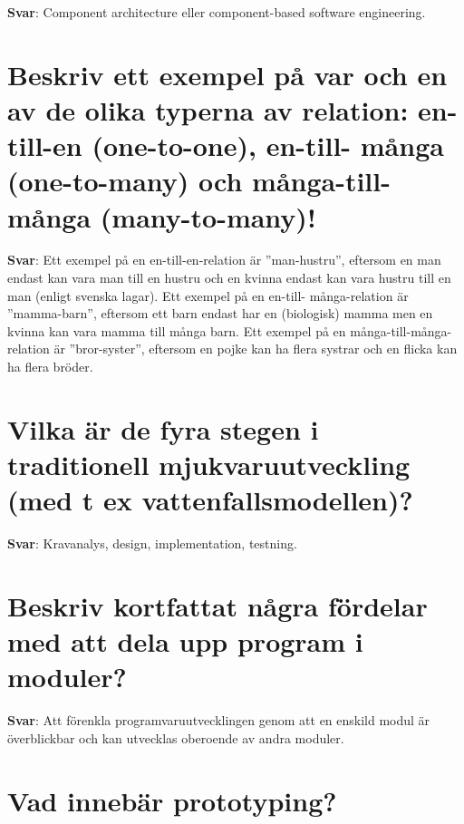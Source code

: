 \documentclass[a4paper,11pt,oneside]{book}
\begin{document}
\begin{sloppypar}
\textbf{Svar}: Component architecture eller component-based software engineering.



\section{Beskriv ett exempel p\r{a} var och en av de olika typerna av relation: en-till-en (one-to-one), en-till- m\r{a}nga (one-to-many) och m\r{a}nga-till-m\r{a}nga (many-to-many)!}

\label{q:232:sa:sv:True}

\textbf{Svar}: Ett exempel p\r{a} en en-till-en-relation \"ar {\textquotedblright}man-hustru{\textquotedblright}, eftersom en man endast kan vara man till en hustru och en kvinna endast kan vara hustru till en man (enligt svenska lagar). Ett exempel p\r{a} en en-till- m\r{a}nga-relation \"ar {\textquotedblright}mamma-barn{\textquotedblright}, eftersom ett barn endast har en (biologisk) mamma men en kvinna kan vara mamma till m\r{a}nga barn. Ett exempel p\r{a} en m\r{a}nga-till-m\r{a}nga-relation \"ar {\textquotedblright}bror-syster{\textquotedblright}, eftersom en pojke kan ha flera systrar och en flicka kan ha flera br\"oder.



\section{Vilka \"ar de fyra stegen i traditionell mjukvaruutveckling (med t ex vattenfallsmodellen)?}

\label{q:233:sa:sv:True}

\textbf{Svar}: Kravanalys, design, implementation, testning.



\section{Beskriv kortfattat n\r{a}gra f\"ordelar med att dela upp program i moduler?}

\label{q:234:sa:sv:True}

\textbf{Svar}: Att f\"orenkla programvaruutvecklingen genom att en enskild modul \"ar \"overblickbar och kan utvecklas oberoende av andra moduler.



\section{Vad inneb\"ar prototyping?}


\end{sloppypar}
\end{document}
